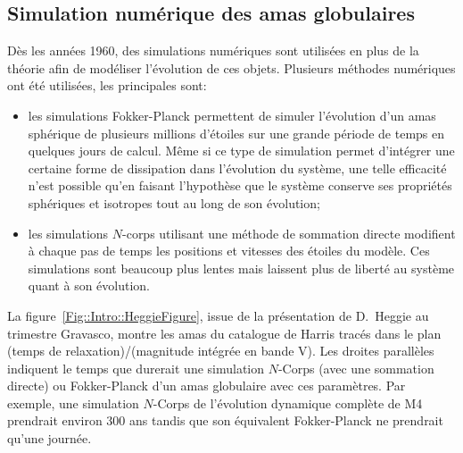 		\subsection{Simulation numérique des amas globulaires}

			Dès les années 1960, des simulations numériques sont utilisées en plus de la théorie afin de modéliser l'évolution de ces
			objets. Plusieurs méthodes numériques ont été utilisées, les principales sont:
			\begin{itemize}

					\item les simulations Fokker-Planck permettent de
						simuler l'évolution d'un amas sphérique de plusieurs millions
						d'étoiles sur une grande période de temps en quelques
						jours de calcul. Même si ce type de simulation permet d'intégrer une
						certaine forme de dissipation dans l'évolution du système, une telle
						efficacité n'est possible qu'en faisant l'hypothèse que le système
						conserve ses propriétés sphériques et isotropes tout au long de son
						évolution;%


					\item les simulations $N$-corps utilisant une méthode de sommation directe modifient à chaque pas de
						temps les positions et vitesses des étoiles du modèle. Ces simulations sont beaucoup plus lentes mais
						laissent plus de liberté au système quant à son évolution.


			\end{itemize}
			La figure~\ref{Fig::Intro::HeggieFigure}, issue de la présentation de D.~Heggie au trimestre Gravasco, montre les amas du
			catalogue de Harris tracés dans le plan (temps de relaxation)/(magnitude intégrée en bande V). Les droites parallèles
			indiquent le temps que durerait une simulation $N$-Corps (avec une sommation directe) ou Fokker-Planck d'un amas globulaire
			avec ces paramètres. Par exemple, une simulation $N$-Corps de l'évolution dynamique complète de M4 prendrait environ 300 ans
			tandis que son équivalent Fokker-Planck ne prendrait qu'une journée.

